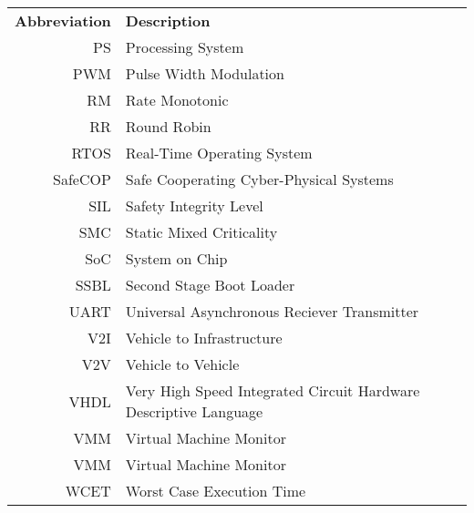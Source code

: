 \begin{tabular}{r l}
\textbf{Abbreviation} 	& \textbf{Description} \vspace{.5em} \\
PS                &Processing System\\
PWM                &Pulse Width Modulation\\
RM                &Rate Monotonic\\
RR                &Round Robin\\
RTOS        &Real-Time Operating System\\
SafeCOP        &Safe Cooperating Cyber-Physical Systems\\
SIL                &Safety Integrity Level\\
SMC                &Static Mixed Criticality\\
SoC                &System on Chip\\
SSBL        &Second Stage Boot Loader\\
UART        &Universal Asynchronous Reciever Transmitter\\
V2I                &Vehicle to Infrastructure\\
V2V                &Vehicle to Vehicle\\
VHDL        &Very High Speed Integrated Circuit Hardware Descriptive Language\\
VMM                &Virtual Machine Monitor\\
VMM                &Virtual Machine Monitor\\
WCET        &Worst Case Execution Time\\
\end{tabular}

